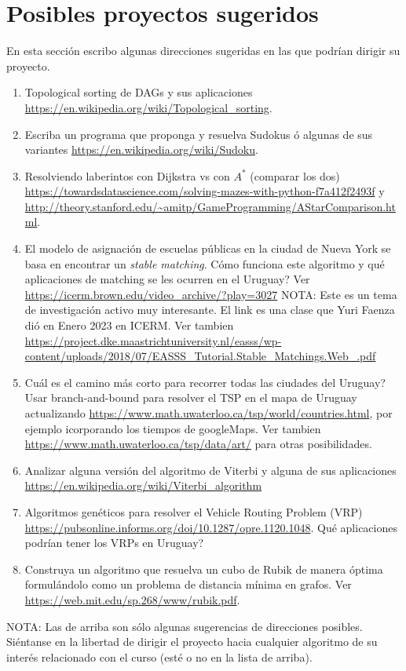 \documentclass[12pt, a4paper]{article}
\begin{document}
\section{Posibles proyectos sugeridos}
En esta secci\'on escribo algunas direcciones sugeridas en las que podr\'ian dirigir su proyecto.  
\begin{enumerate}
\item Topological sorting de DAGs y sus aplicaciones \url{https://en.wikipedia.org/wiki/Topological_sorting}.
\item Escriba un programa que proponga y resuelva Sudokus \'o algunas de sus variantes \url{https://en.wikipedia.org/wiki/Sudoku}. 
\item Resolviendo laberintos con Dijkstra vs con $A^*$ (comparar los dos) \url{https://towardsdatascience.com/solving-mazes-with-python-f7a412f2493f} y \url{http://theory.stanford.edu/~amitp/GameProgramming/AStarComparison.html}.
\item El modelo de asignaci\'on de escuelas p\'ublicas en la ciudad de Nueva York se basa en encontrar un {\it stable matching}. C\'omo funciona este algoritmo y qu\'e aplicaciones de matching se les ocurren en el Uruguay? Ver  
\url{https://icerm.brown.edu/video_archive/?play=3027} NOTA: Este es un tema de investigaci\'on activo muy interesante. El link es una clase que Yuri Faenza di\'o en Enero 2023 en ICERM. Ver tambien \url{https://project.dke.maastrichtuniversity.nl/easss/wp-content/uploads/2018/07/EASSS_Tutorial.Stable_Matchings.Web_.pdf}
\item Cu\'al es el camino m\'as corto para recorrer todas las ciudades del Uruguay? Usar branch-and-bound para resolver el TSP en el mapa de Uruguay actualizando \url{https://www.math.uwaterloo.ca/tsp/world/countries.html}, por ejemplo icorporando los tiempos de googleMaps. Ver tambien \url{https://www.math.uwaterloo.ca/tsp/data/art/} para otras posibilidades.
\item Analizar alguna versi\'on del algoritmo de Viterbi y alguna de sus aplicaciones \url{https://en.wikipedia.org/wiki/Viterbi_algorithm}
\item Algoritmos gen\'eticos para resolver el Vehicle Routing Problem (VRP) \url{https://pubsonline.informs.org/doi/10.1287/opre.1120.1048}. Qu\'e aplicaciones podr\'ian tener los VRPs en Uruguay?
\item Construya un algoritmo que resuelva un cubo de Rubik de manera \'optima formul\'andolo como un problema de distancia m\'inima en grafos. Ver \url{https://web.mit.edu/sp.268/www/rubik.pdf}.    
\end{enumerate}
NOTA: Las de arriba son s\'olo algunas sugerencias de direcciones posibles. Si\'entanse en la libertad de dirigir el proyecto hacia cualquier algoritmo de su inter\'es relacionado con el curso (est\'e o no en la lista de arriba). 
\end{document}
